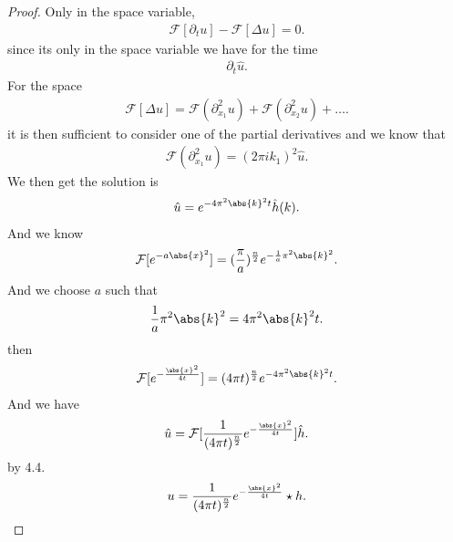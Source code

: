 \begin{proof}
  Only in the space variable,
 \begin{align*}
   \mathcal{F}[\partial_t u] - \mathcal{F}[\Delta  u] = 0
 .\end{align*} 
 since its only in the space variable we have for the time 
 \begin{align*}
  \partial_t \hat{u}  
 .\end{align*}
 For the space 
 \begin{align*}
   \mathcal{F}[\Delta  u]  = \mathcal{F}(\partial_{x_{1}}^2 u) +  \mathcal{F}(\partial_{x_{2}}^2 u) + \ldots 
 .\end{align*}
 it is then sufficient to consider one of the partial derivatives and we know that 
 \begin{align*}
  \mathcal{F}(\partial_{x_{1}}^2 u) = (2\pi ik_{1})^2 \hat{u} 
 .\end{align*}
 We then get the solution is 
 \begin{align*}
  \hat{u} = e^{-4\pi ^2 \abs{k}^2 t}  \hat{h}(k)
 .\end{align*}
 And we know 
 \begin{align*}
   \mathcal{F}[e^{-a \abs{x}^2} ] = (\frac{\pi}{a})^{\frac{n}{2}} e^{-\frac{1}{a}\pi ^2 \abs{k}^2} 
 .\end{align*}
 And we choose $a$ such that
 \begin{align*}
   \frac{1}{a}\pi ^2 \abs{k}^2 = 4 \pi ^2 \abs{k}^2 t
 .\end{align*}
 then 
 \begin{align*}
   \mathcal{F}[e^{-\frac{\abs{x}^2}{4t}} ] = (4\pi t)^{\frac{n}{2}} e^{-4\pi ^2 \abs{k}^2 t}  
 .\end{align*}
 And we have 
 \begin{align*}
   \hat{u} = \mathcal{F}[\frac{1}{(4\pi t)^{\frac{n}{2}} } e^{-\frac{\abs{x}^2}{4t}} ]\hat{h} 
   .\end{align*}
   by 4.4.
   \begin{align*}
    u = \frac{1}{(4\pi t)^{\frac{n}{2}} }e^{-\frac{\abs{x}^2}{4t}}  \star h
   .\end{align*}
\end{proof}
